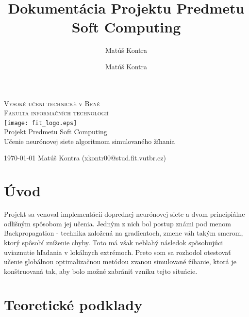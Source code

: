 \documentclass[11pt,a4paper]{article}
\author{Matúš Kontra}
\title{Dokumentácia Projektu Predmetu Soft Computing}
\author{Matúš Kontra}
\begin{document}
\begin{titlepage}
\begin{center}
{\textsc{Vysoké učení technické v Brně}}\\
{\textsc{Fakulta informačních technologií}}\\
\texttt{[image: fit\_logo.eps]} \\
\Large{\textup{Projekt Predmetu Soft Computing\\}}
\Huge{\textup{Učenie neurónovej siete algoritmom simulovaného žíhania}}
\end{center}
{ \today \hfill
Matúš Kontra (xkontr00@stud.fit.vutbr.cz)}
\end{titlepage}

\tableofcontents
\newpage
\section{Úvod}
Projekt sa venoval implementácii doprednej neurónovej siete a dvom principiálne odlišným spôsobom jej učenia. Jedným z nich bol postup známi pod menom Backpropagation - technika založená na gradientoch, zmene váh takým smerom, ktorý spôsobí zníženie chyby. Toto má však neblahý následok spôsobujúci uviaznutie hľadania v lokálnych extrémoch. Preto som sa rozhodol otestovať učenie globálnou optimalizačnou metódou zvanou simulované žíhanie, ktorá je konštruovaná tak, aby bolo možné zabrániť vzniku tejto situácie.
\section{Teoretické podklady}
\end{document}
